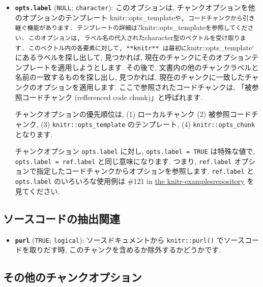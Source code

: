 \documentclass[
  lualatex,ja=standard,jafont=noto-otf]{bxjsreport}
\providecommand{\tightlist}{%
  \setlength{\itemsep}{0pt}\setlength{\parskip}{0pt}}
\begin{document}
\begin{itemize}
\item
  \textbf{\texttt{opts.label}} (\texttt{NULL}; \texttt{character}):
  このオプションは, チャンクオプションを他のオプションのテンプレート
  knitr::opts\_template\texttt{や,\ コードチャンクから引き継ぐ機能があります.\ テンプレートの詳細は}?knitr::opts\_template\texttt{を参照してください.\ このオプションは,\ ラベル名の代入された}character\texttt{型のベクトルを受け取ります.\ このベクトル内の各要素に対して,\ **knitr**\ は最初に}knitr::opts\_template`
  にあるラベルを探し出して, 見つかれば,
  現在のチャンクにそのオプションテンプレートを適用しようとします.
  その後で, 文書内の他のチャンクラベルと名前の一致するものを探し出し,
  見つかれば, 現在のチャンクに一致したチャンクのオプションを適用します.
  ここで参照されたコードチャンクは, 「被参照コードチャンク (refferenced
  code chunk)」と呼ばれます.

  チャンクオプションの優先順位は, (1) ローカルチャンク (2)
  被参照コードチャンク, (3) \texttt{knitr::opts\_template}
  のテンプレート, (4) \texttt{knitr::opts\_chunk} となります.

  チャンクオプション \texttt{opts.label} に対し,
  \texttt{opts.label\ =\ TRUE} は特殊な値で,
  \texttt{opts.label\ =\ ref.label} と同じ意味になります. つまり,
  \texttt{ref.label}
  オプションで指定したコードチャンクからオプションを参照します.
  \texttt{ref.label} と \texttt{opts.label} のいろいろな使用例は \#121
  in \href{https://github.com/yihui/knitr-examples}{the
  knitr-examplesrepository} を見てください.
\end{itemize}

\hypertarget{ux30bdux30fcux30b9ux30b3ux30fcux30c9ux306eux62bdux51faux95a2ux9023}{%
\subsection{ソースコードの抽出関連}\label{ux30bdux30fcux30b9ux30b3ux30fcux30c9ux306eux62bdux51faux95a2ux9023}}

\begin{itemize}
\tightlist
\item
  \textbf{\texttt{purl}} (\texttt{TRUE}; \texttt{logical}):
  ソースドキュメントから \texttt{knitr::purl()}
  でソースコードを取りだす時,
  このチャンクを含めるか除外するかどうかです.
\end{itemize}

\hypertarget{ux305dux306eux4ed6ux306eux30c1ux30e3ux30f3ux30afux30aaux30d7ux30b7ux30e7ux30f3}{%
\subsection{その他のチャンクオプション}\label{ux305dux306eux4ed6ux306eux30c1ux30e3ux30f3ux30afux30aaux30d7ux30b7ux30e7ux30f3}}
\end{document}
